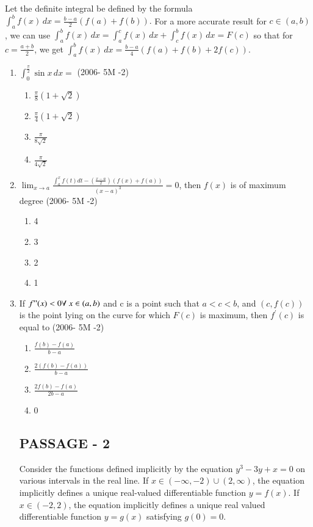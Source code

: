 \documentclass[journal,12pt,onecolumn]{IEEEtran}
\theoremstyle{remark}
\begin{document}
Let the definite integral be defined by the formula
$\int_a^b f(x) \, dx = \frac{b-a}{2} ( f(a) + f(b) ).$
For a more accurate result for $ c \in (a, b) $, we can use
$\int_a^b f(x) \, dx = \int_a^c f(x) \, dx + \int_c^b f(x) \, dx = F(c)$
so that for \( c = \frac{a+b}{2} \), we get
$\int_a^b f(x) \, dx = \frac{b-a}{4}( f(a) + f(b) + 2f(c) )$.
\begin{enumerate}
\item $\int_0^{\frac{\pi}{2}} \sin x \, dx =$
\hfill{(2006- 5M -2)}
\begin{enumerate}[label=(\alph*)]
    \item $ \frac{\pi}{8} ( 1 + \sqrt{2} ) $
    \item $\frac{\pi}{4} ( 1 + \sqrt{2} ) $
    \item $ \frac{\pi}{8\sqrt{2}}$
    \item  $\frac{\pi}{4\sqrt{2}}$ 
\end{enumerate}
\item $\lim_{x \to a} \frac{\int_a^x f(t)dt - (\frac{x-a}{2})(f(x) + f(a))}{(x - a)^3} = 0 $, then  $f(x)$  is 
 of maximum degree 
 \hfill{(2006- 5M -2)}
 \begin{enumerate}[label=(\alph*)]
    \item  4 
    \item  3 
    \item  2 
    \item  1
  \end{enumerate}
 \item If $ f"(x) < 0  \forall \ x \in (a, b) $ and  c  is a point such that $a < c < b $, and $(c, f(c))$ is the point lying on the curve for which $F(c)$ is maximum, then $f^{\prime}(c)$ is equal to
 \hfill{(2006- 5M -2)}
 \begin{enumerate}[label=(\alph*)]
    \item  $\frac{f(b) - f(a)}{b - a} $
    \item  $ \frac{2(f(b) - f(a))}{b - a} $
    \item  $ \frac{2f(b) - f(a)}{2b - a} $
    \item  0
\end{enumerate}
\subsection{PASSAGE - 2}
 
 Consider the functions defined implicitly by the equation 
$y^3 - 3y + x = 0$
on various intervals in the real line. If $ x \in (-\infty, -2) \cup (2, \infty) $, the equation implicitly defines a unique real-valued differentiable function $ y = f(x) $. If $x \in (-2, 2)$, the equation implicitly defines a unique real valued differentiable function $y = g(x)$ satisfying $ g(0) = 0$.


\end{enumerate}
\end{document}
